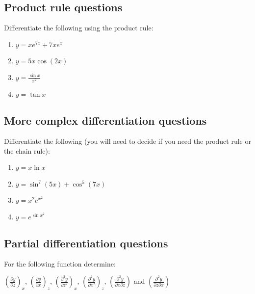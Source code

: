 \documentclass[
]{book}
\providecommand{\tightlist}{%
  \setlength{\itemsep}{0pt}\setlength{\parskip}{0pt}}
\begin{document}
\hypertarget{product-rule-questions}{%
\subsection{Product rule questions}\label{product-rule-questions}}

Differentiate the following using the product rule:

\begin{enumerate}
\def\labelenumi{\arabic{enumi}.}
\tightlist
\item
  \(y = x e^{7x}+ 7xe^x\)
\item
  \(y = 5x \cos (2x)\)
\item
  \(y = \frac{\sin x}{x^2}\)
\item
  \(y = \tan x\)
\end{enumerate}

\hypertarget{more-complex-differentiation-questions}{%
\subsection{More complex differentiation questions}\label{more-complex-differentiation-questions}}

Differentiate the following (you will need to decide if you need the product rule or the chain rule):

\begin{enumerate}
\def\labelenumi{\arabic{enumi}.}
\tightlist
\item
  \(y = x \ln x\)
\item
  \(y = \sin ^7 (5x)+ \cos ^5 (7x)\)
\item
  \(y = x^2 e^{x^2}\)
\item
  \(y = e^{\sin x^2}\)
\end{enumerate}

\hypertarget{partial-differentiation-questions}{%
\subsection{Partial differentiation questions}\label{partial-differentiation-questions}}

For the following function determine:

\(\left(\frac{\partial y}{\partial z}\right)_x\), \(\left(\frac{\partial y}{\partial x}\right)_z\), \(\left(\frac{\partial^2 y}{\partial z^2}\right)_x\), \(\left(\frac{\partial^2 y}{\partial x^z}\right)_z\), \(\left(\frac{\partial^2 y}{\partial x \partial z}\right)\) and \(\left(\frac{\partial^2 y}{\partial z \partial x}\right)\)
\end{document}
